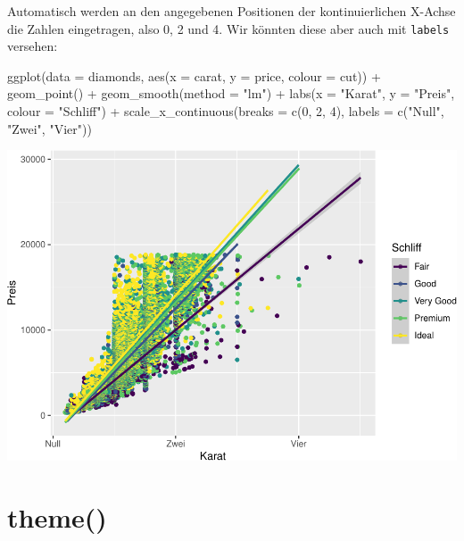 \documentclass[
]{book}
\newenvironment{Shaded}{\begin{snugshade}}{\end{snugshade}}
\newcommand{\AttributeTok}[1]{\textcolor[rgb]{0.77,0.63,0.00}{#1}}
\newcommand{\DecValTok}[1]{\textcolor[rgb]{0.00,0.00,0.81}{#1}}
\newcommand{\FunctionTok}[1]{\textcolor[rgb]{0.00,0.00,0.00}{#1}}
\newcommand{\NormalTok}[1]{#1}
\newcommand{\SpecialCharTok}[1]{\textcolor[rgb]{0.00,0.00,0.00}{#1}}
\newcommand{\StringTok}[1]{\textcolor[rgb]{0.31,0.60,0.02}{#1}}
\begin{document}
Automatisch werden an den angegebenen Positionen der kontinuierlichen X-Achse die Zahlen eingetragen, also 0, 2 und 4. Wir könnten diese aber auch mit \texttt{labels} versehen:

\begin{Shaded}
\begin{Highlighting}[]
\FunctionTok{ggplot}\NormalTok{(}\AttributeTok{data =}\NormalTok{ diamonds, }\FunctionTok{aes}\NormalTok{(}\AttributeTok{x =}\NormalTok{ carat, }\AttributeTok{y =}\NormalTok{ price, }\AttributeTok{colour =}\NormalTok{ cut)) }\SpecialCharTok{+}
  \FunctionTok{geom\_point}\NormalTok{() }\SpecialCharTok{+}
  \FunctionTok{geom\_smooth}\NormalTok{(}\AttributeTok{method =} \StringTok{"lm"}\NormalTok{) }\SpecialCharTok{+}
  \FunctionTok{labs}\NormalTok{(}\AttributeTok{x =} \StringTok{"Karat"}\NormalTok{, }\AttributeTok{y =} \StringTok{"Preis"}\NormalTok{, }\AttributeTok{colour =} \StringTok{"Schliff"}\NormalTok{) }\SpecialCharTok{+}
  \FunctionTok{scale\_x\_continuous}\NormalTok{(}\AttributeTok{breaks =} \FunctionTok{c}\NormalTok{(}\DecValTok{0}\NormalTok{, }\DecValTok{2}\NormalTok{, }\DecValTok{4}\NormalTok{), }\AttributeTok{labels =} \FunctionTok{c}\NormalTok{(}\StringTok{"Null"}\NormalTok{, }\StringTok{"Zwei"}\NormalTok{, }\StringTok{"Vier"}\NormalTok{))}
\end{Highlighting}
\end{Shaded}

\includegraphics{CFH_R_bookdown_files/figure-latex/unnamed-chunk-177-1.pdf}

\hypertarget{theme}{%
\section{theme()}\label{theme}}
\end{document}
